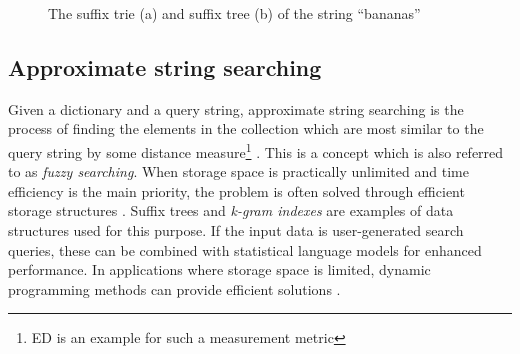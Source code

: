 \documentclass[thesis.tex]{subfiles}
\begin{document}
\begin{figure}[htpb]
\begin{minipage}[t]{0.49\textwidth}
\begin{subfigure}[t]{\textwidth}
\begin{mdframed}
\begin{center}
        \end{center}
      \end{mdframed}
      \caption{}
      \label{fig:suffix_tree}
    \end{subfigure}
    \begin{minipage}[t]{0.49\textwidth}
      \caption[Examples of suffix trees]{The suffix trie (a) and suffix tree  (b) of the string ``bananas''}
    \end{minipage}
  \end{minipage}
  \label{fig:suffix_trees}
\end{figure}
\subsection{Approximate string searching}
Given a dictionary and a query string, approximate string searching is the process of finding the elements in the collection which are most similar to the query string by some distance measure\footnote{ED is an example for such a measurement metric} \cite{approx_string_search}. This is a concept which is also referred to as \textit{fuzzy searching}. When storage space is practically unlimited and time efficiency is the main priority, the problem is often solved through efficient storage structures \cite[Chapter 3]{information_retrieval}. Suffix trees and \textit{k-gram indexes} are examples of data structures used for this purpose. If the input data is user-generated search queries, these can be combined with statistical language models for enhanced performance. In applications where storage space is limited, dynamic programming methods can provide efficient solutions \cite{evolutionary_distance}.
\clearpage
\end{document}
